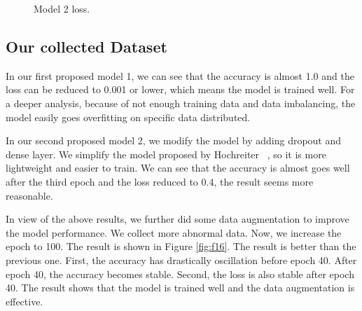 \documentclass[10pt,twocolumn,letterpaper]{article}
\begin{document}
\begin{figure}[t]
    \centering
    \caption{Model 2 loss.}
    \label{fig:f15}
\end{figure}

\subsection{Our collected Dataset}
\label{sec:our dataset}

    In our first proposed model 1, we can see that the accuracy is almost 1.0 and the loss can be reduced to 0.001 or lower, which means the model is trained well. For a deeper analysis, because of not enough training data and data imbalancing, the model easily goes overfitting on specific data distributed.

    In our second proposed model 2, we modify the model by adding dropout and dense layer. We simplify the model proposed by Hochreiter \etal~\cite{10.1162/neco.1997.9.8.1735}, so it is more lightweight and easier to train. We can see that the accuracy is almost goes well after the third epoch and the loss reduced to 0.4, the result seems more reasonable.

    In view of the above results, we further did some data augmentation to improve the model performance. We collect more abnormal data. Now, we increase the epoch to 100. The result is shown in Figure \ref{fig:f16}. The result is better than the previous one. First, the accuracy has drastically oscillation before epoch 40. After epoch 40, the accuracy becomes stable. Second, the loss is also stable after epoch 40. The result shows that the model is trained well and the data augmentation is effective.
\end{document}
